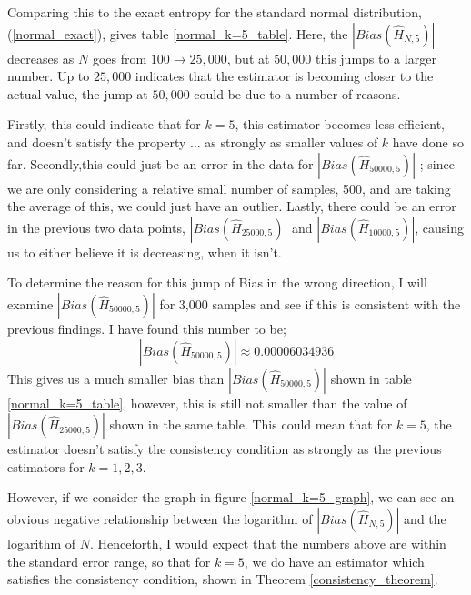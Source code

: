 \documentclass{article}
\begin{document}
Comparing this to the exact entropy for the standard normal distribution, (\ref{normal_exact}), gives table \ref{normal_k=5_table}. Here, the $|Bias(\hat{H}_{N, 5})|$ decreases as $N$ goes from $100 \to 25,000$, but at $50,000$ this jumps to a larger number. Up to $25,000$ indicates that the estimator is becoming closer to the actual value, the jump at $50,000$  could be due to a number of reasons. 

Firstly, this could indicate that for $k=5$, this estimator becomes less efficient, and doesn't satisfy the property ...  as strongly as smaller values of $k$ have done so far. Secondly,this could just be an error in the data for $|Bias(\hat{H}_{50000, 5})|$ ; since we are only considering a relative small number of samples, 500, and are taking the average of this, we could just have an outlier. Lastly, there could be an error in the previous two data points, $|Bias(\hat{H}_{25000, 5})|$ and $|Bias(\hat{H}_{10000, 5})|$, causing us to either believe it is decreasing, when it isn't.

To determine the reason for this jump of Bias in the wrong direction, I will examine $|Bias(\hat{H}_{50000, 5})|$ for 3,000 samples and see if this is consistent with the previous findings. I have found this number to be; 
\begin{equation} 
|Bias(\hat{H}_{50000, 5})|  \approx 0.00006034936 \nonumber
\end{equation}
This gives us a much smaller bias than $|Bias(\hat{H}_{50000, 5})|$ shown in table \ref{normal_k=5_table}, however, this is still not smaller than the value of $|Bias(\hat{H}_{25000, 5})|$ shown in the same table. This could mean that for $k=5$, the estimator doesn't satisfy the consistency condition as strongly as the previous estimators for $k=1, 2, 3$.

However, if we consider the graph in figure \ref{normal_k=5_graph}, we can see an obvious negative relationship between the logarithm of $|Bias(\hat{H}_{N, 5})|$ and the logarithm of $N$. Henceforth, I would expect that the numbers above are within the standard error range, so that for $k=5$, we do have an estimator which satisfies the consistency condition, shown in Theorem \ref{consistency_theorem}.
\end{document}
